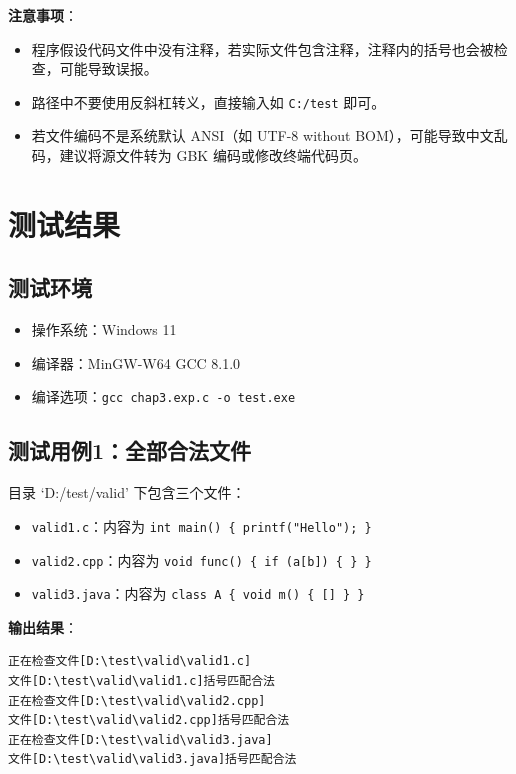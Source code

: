 \documentclass[UTF8]{ctexart}
\begin{document}
\textbf{注意事项}：
\begin{itemize}
    \item 程序假设代码文件中没有注释，若实际文件包含注释，注释内的括号也会被检查，可能导致误报。
    \item 路径中不要使用反斜杠转义，直接输入如 \texttt{C:/test} 即可。
    \item 若文件编码不是系统默认 ANSI（如 UTF-8 without BOM），可能导致中文乱码，建议将源文件转为 GBK 编码或修改终端代码页。
\end{itemize}

\section{测试结果}

\subsection{测试环境}
\begin{itemize}
    \item 操作系统：Windows 11
    \item 编译器：MinGW-W64 GCC 8.1.0
    \item 编译选项：\texttt{gcc chap3.exp.c -o test.exe}
\end{itemize}

\subsection{测试用例1：全部合法文件}
目录 ‘D:/test/valid’ 下包含三个文件：
\begin{itemize}
    \item \texttt{valid1.c}：内容为 \texttt{int main() \{ printf("Hello"); \}}
    \item \texttt{valid2.cpp}：内容为 \texttt{void func() \{ if (a[b]) \{ \} \}}
    \item \texttt{valid3.java}：内容为 \texttt{class A \{ void m() \{ [] \} \}}
\end{itemize}
\textbf{输出结果}：
\begin{verbatim}
正在检查文件[D:\test\valid\valid1.c]
文件[D:\test\valid\valid1.c]括号匹配合法
正在检查文件[D:\test\valid\valid2.cpp]
文件[D:\test\valid\valid2.cpp]括号匹配合法
正在检查文件[D:\test\valid\valid3.java]
文件[D:\test\valid\valid3.java]括号匹配合法
\end{verbatim}
\end{document}
